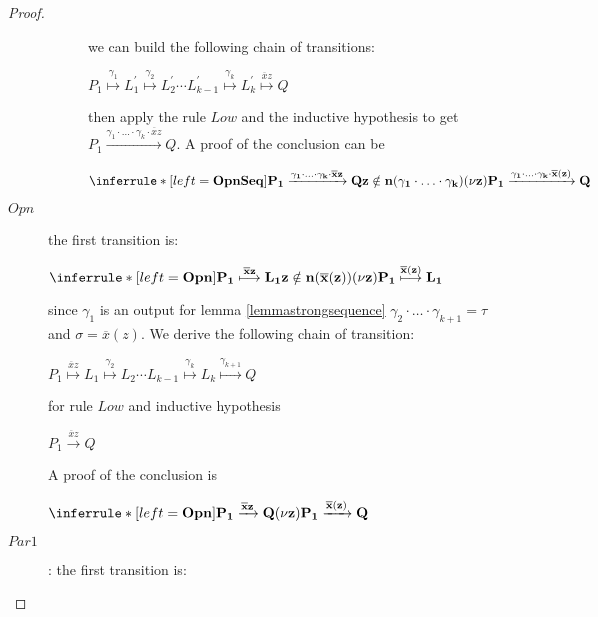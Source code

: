 \begin{proposition}
\begin{proof}
\begin{description}
\begin{description}
		    we can build the following chain of transitions:
		    \begin{center}
		      $P_{1} \stackrel{\gamma_{1}}{\longmapsto} L_{1}^{'} \stackrel{\gamma_{2}}{\longmapsto} L_{2}^{'} \cdots L_{k-1}^{'} \stackrel{\gamma_{k}}{\longmapsto} L_{k}^{'}\stackrel{\overline{x}z}{\longmapsto} Q$ 
		    \end{center}
		    then apply the rule $Low$ and the inductive hypothesis to get $P_{1} \xrightarrow{\gamma_{1}\cdot \ldots \cdot \gamma_{k} \cdot \overline{x}z} Q$. A proof of the conclusion can be
		    \begin{center}
		      $\inferrule* [left=\bf{OpnSeq}]{
			  P_{1} \xrightarrow{\gamma_{1}\cdot \ldots \cdot \gamma_{k} \cdot \overline{x}z} Q
			\\
			  z\notin n(\gamma_{1}\cdot \ldots \cdot \gamma_{k})
		      }{
			(\nu z)P_{1} \xrightarrow{\gamma_{1}\cdot \ldots \cdot \gamma_{k} \cdot \overline{x}(z)} Q
		      }$
		    \end{center}
		\end{description}
	      \item[$Opn$] the first transition is:
		\begin{center}
		  $\inferrule* [left=\bf{Opn}]{
			P_{1} \stackrel{\overline{x}z}{\longmapsto} L_{1}
		      \\
			z\notin n(\overline{x}(z))
		    }{
		      (\nu z) P_{1} \stackrel{\overline{x}(z)}{\longmapsto} L_{1}
		  }$ 
		\end{center}		
		since $\gamma_{1}$ is an output for lemma \ref{lemmastrongsequence} $\gamma_{2}\cdot \ldots \cdot \gamma_{k+1}=\tau$ and $\sigma=\overline{x}(z)$. We derive the following chain of transition:
		\begin{center}
		  $P_{1} \stackrel{\overline{x}z}{\longmapsto} L_{1} \stackrel{\gamma_{2}}{\longmapsto} L_{2} \cdots L_{k-1} \stackrel{\gamma_{k}}{\longmapsto} L_{k}\stackrel{\gamma_{k+1}}{\longmapsto} Q$ 
		\end{center}
		for rule $Low$ and inductive hypothesis
		\begin{center}
		  $P_{1} \xrightarrow{\overline{x}z} Q$ 
		\end{center}
		A proof of the conclusion is
		\begin{center}
		  $\inferrule* [left=\bf{Opn}]{
		    P_{1} \xrightarrow{\overline{x}z} Q
		  }{
		    (\nu z)P_{1} \xrightarrow{\overline{x}(z)} Q
		  }$ 
		\end{center}
	      \item[$Par1$]: 
		the first transition is:

\end{description}
\end{proof}
\end{proposition}
